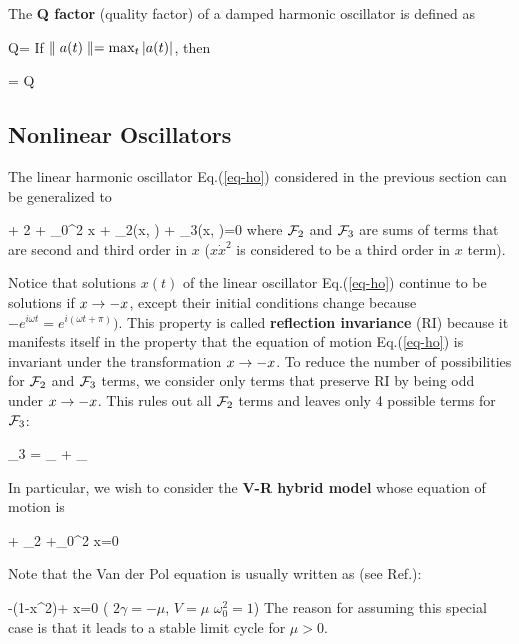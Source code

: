 The {\bf Q factor} (quality factor) of a damped harmonic oscillator is defined as

\beq
Q= 
\eeq
If $\parallel a(t)\parallel=\max_t|a(t)|$, then

\beq
{}
\approx
{}
=
Q
\eeq


\subsection{Nonlinear Oscillators}
The linear harmonic oscillator
Eq.(\ref{eq-ho})
considered in the previous
section can be
generalized to
 
\beq
{} + 2\gamma {} + \omega_0^2 x + \calf_2(x, )  + \calf_3(x, )=0
\eeq
where ${\cal F}_2$ and ${\cal F}_3$ are sums of terms  that are second and third order in $x$ ($x\dot{x}^2$ is
considered to be a third order in $x$ term).

Notice that solutions $x(t)$
of the linear oscillator
Eq.(\ref{eq-ho})
continue to be solutions if $x\rightarrow -x$, except their initial conditions change because $-e^{i\omega t}= e^{i(\omega t +\pi)})$.
This property is called {\bf
reflection invariance} (RI)
because it manifests itself in the property that the equation
of motion Eq.(\ref{eq-ho})
is invariant under the
transformation $x\rightarrow -x$.
To reduce the number of possibilities for ${\cal F}_2$ and
${\cal F}_3$ terms, we
consider only terms that 
preserve RI by being odd under
$x\rightarrow -x$.
This rules out all ${\cal F}_2$ terms
and leaves only 4 possible terms for ${\cal F}_3$:

\beq 
\calf_3 = _{}
+ _{}
\eeq

In particular,
we wish to consider the {\bf V-R hybrid model}
whose equation of motion is

\beq
{} + _{2\TIL{\gamma}}
 +\omega_0^2 x=0
\eeq

Note that the Van der Pol equation is usually written as
(see Ref.\cite{wiki-van-der-pol}):

\beq {}  -\mu(1-x^2)+ x=0
\quad (\text
 {$2\gamma = -\mu$, $V=\mu$
$\omega^2_0=1$})
\eeq
The reason for
assuming this special case is that it leads to a 
stable limit cycle for $\mu>0$. 

